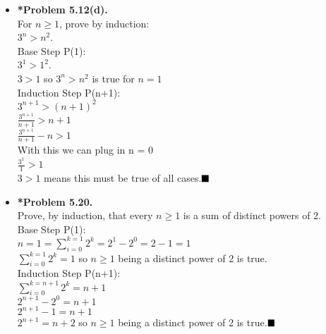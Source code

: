 \documentclass[11pt]{article}
\begin{document}
\begin{itemize}
\vspace{0.1in}

\item \textbf{*Problem 5.12(d).} 
\\For $n \ge 1$, prove by induction:
\\$3^n > n^2$.
\\Base Step P(1):
\\$3^1 > 1^2$.
\\$3>1$ so $3^n > n^2$ is true for $n=1$
\\Induction Step P(n+1):
\\$3^{n+1} > (n+1)^2$
\\$\frac{3^{n+1}}{n+1} > n+1$
\\$\frac{3^{n+1}}{n+1}-n > 1$
\\With this we can plug in n = 0
\\$\frac{3^1}{1} > 1$
\\$3 > 1$ means this must be true of all cases.$\hfill\blacksquare$

\vspace{0.1in}

\item \textbf{*Problem 5.20.} 
\\Prove, by induction, that every $n \ge 1$ is a sum of distinct powers of 2.
\\Base Step P(1):
\\$n = 1 = \sum_{i=0}^{k=1}{2^k} = 2^1 - 2^0 = 2 - 1 = 1$
\\$\sum_{i=0}^{k=1}{2^k} = 1$ so $n \ge 1$ being a distinct power of 2 is true.
\\Induction Step P(n+1):
\\$\sum_{i=0}^{k=n+1}{2^k} = n+1$
\\$2^{n+1} - 2^0 = n + 1$
\\$2^{n+1} - 1 = n + 1$
\\$2^{n+1}  = n + 2$ so $n \ge 1$ being a distinct power of 2 is true.$\hfill\blacksquare$

\vspace{0.1in}


\end{itemize}
\end{document}
